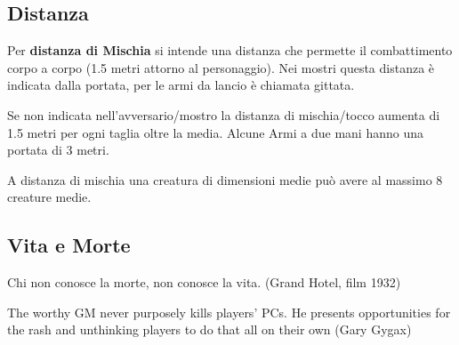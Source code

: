 \documentclass[12pt,a4paper,twoside,openany]{book}
\begin{document}
\begin{multicols}{2}
\subsection{Distanza}\label{distanza}

Per \textbf{distanza di Mischia}  si intende una distanza che permette il combattimento corpo a corpo (1.5 metri attorno al personaggio). Nei mostri questa distanza è indicata dalla portata, per le armi da lancio è chiamata gittata.

Se non indicata nell'avversario/mostro la distanza di mischia/tocco aumenta di 1.5 metri per ogni taglia oltre la media.
Alcune Armi a due mani hanno una portata di 3 metri.

A distanza di mischia una creatura di dimensioni medie può avere al massimo 8 creature medie.

\end{multicols}

\pagebreak

\subsection{Vita e Morte}\label{morire}

\begin{changemargin}{0.3cm}{0.3cm}\begin{enfasi}{Chi non conosce la morte, non conosce la vita. (Grand Hotel, film 1932)

\medskip

The worthy GM never purposely kills players' PCs. He presents opportunities for the rash and unthinking players to do that all on their own (Gary Gygax)}\end{enfasi}\end{changemargin}\medskip
\end{document}
